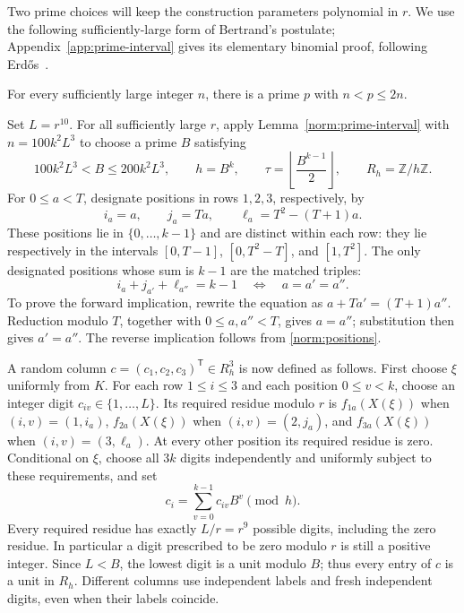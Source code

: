 Two prime choices will keep the construction parameters polynomial in
$r$. We use the following sufficiently-large form of Bertrand's postulate;
Appendix~\ref{app:prime-interval} gives its elementary binomial proof,
following Erd\H{o}s~\cite{Erdos1932}.

\begin{lemma}\label{norm:prime-interval}
For every sufficiently large integer $n$, there is a prime $p$ with
$n<p\le2n$.
\end{lemma}

Set $L=r^{10}$.  For all sufficiently large $r$, apply
Lemma~\ref{norm:prime-interval} with $n=100k^2L^3$ to choose a prime
$B$ satisfying
\begin{equation}\label{norm:base}
 100k^2L^3<B\le200k^2L^3,
 \qquad h=B^k,\qquad
 \tau=\left\lfloor\frac{B^{k-1}}2\right\rfloor,
 \qquad R_h=\mathbb Z/h\mathbb Z.
\end{equation}
For $0\le a<T$, designate positions in rows $1,2,3$, respectively, by
\begin{equation}\label{norm:positions}
 i_a=a,\qquad j_a=Ta,\qquad \ell_a=T^2-(T+1)a.
\end{equation}
These positions lie in $\{0,\ldots,k-1\}$ and are distinct within each
row: they lie respectively in the intervals $[0,T-1]$, $[0,T^2-T]$,
and $[1,T^2]$.  The only designated positions whose sum is $k-1$ are
the matched triples:
\begin{equation}\label{norm:matching}
 i_a+j_{a'}+\ell_{a''}=k-1
 \quad\Longleftrightarrow\quad a=a'=a''.
\end{equation}
To prove the forward implication, rewrite the equation as
$a+Ta'=(T+1)a''$.  Reduction modulo $T$, together with
$0\le a,a''<T$, gives $a=a''$; substitution then gives $a'=a''$.
The reverse implication follows from \eqref{norm:positions}.

A random column $c=(c_1,c_2,c_3)^{\mathsf T}\in R_h^3$ is now defined
as follows.  First choose $\xi$ uniformly from $K$.  For each row
$1\le i\le3$ and each position $0\le v<k$, choose an integer digit
$c_{iv}\in\{1,\ldots,L\}$.  Its required residue modulo $r$ is
$f_{1a}(X(\xi))$ when $(i,v)=(1,i_a)$,
$f_{2a}(X(\xi))$ when $(i,v)=(2,j_a)$, and
$f_{3a}(X(\xi))$ when $(i,v)=(3,\ell_a)$.
At every other position its required residue is zero.
Conditional on $\xi$, choose all $3k$ digits independently and uniformly
subject to these requirements, and set
\begin{equation}\label{norm:column}
 c_i=\sum_{v=0}^{k-1}c_{iv}B^v\pmod h.
\end{equation}
Every required residue has exactly $L/r=r^9$ possible digits, including
the zero residue.  In particular a digit prescribed to be zero modulo
$r$ is still a positive integer.  Since $L<B$, the lowest digit is a
unit modulo $B$; thus every entry of $c$ is a unit in $R_h$.
Different columns use independent labels and fresh independent digits,
even when their labels coincide.

